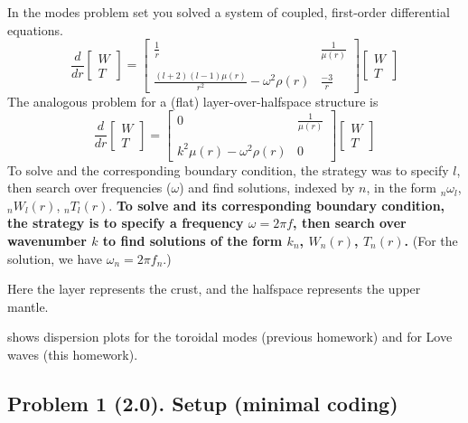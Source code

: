 \documentclass[11pt,titlepage,fleqn]{article}
\begin{document}
In the modes problem set you solved a system of coupled, first-order differential equations.
%
\begin{equation}
\frac{d}{dr}
\left[ \begin{array}{c} W \\ T \end{array} \right]
=
\left[ \begin{array}{cc}
\frac{1}{r} & \frac{1}{\mu(r)} \\
& \\
\frac{(l+2)(l-1)\mu(r)}{r^2} -\omega^2\rho(r)  & \frac{-3}{r}
\end{array} \right]
\left[ \begin{array}{c} W \\ T \end{array} \right]
\label{ODEs}
\end{equation}
%
The analogous problem for a (flat) layer-over-halfspace structure is
%
\begin{equation}
\frac{d}{dr}
\left[ \begin{array}{c} W \\ T \end{array} \right]
=
\left[ \begin{array}{cc}
0 & \frac{1}{\mu(r)} \\
& \\
k^2 \mu(r)-\omega^2\rho(r) & 0
\end{array} \right]
\left[ \begin{array}{c} W \\ T \end{array} \right]
\label{rODEs}
\end{equation}
%
To solve  and the corresponding boundary condition, the strategy was to specify $l$, then search over frequencies ($\omega$) and find solutions, indexed by $n$, in the form $_n\omega_l$, $_nW_l(r)$, $_nT_l(r)$. {\bf To solve  and its corresponding boundary condition, the strategy is to specify a frequency $\omega = 2\pi f$, then search over wavenumber $k$ to find solutions of the form $k_n$, $W_n(r)$, $T_n(r)$.} (For the solution, we have $\omega_n = 2\pi f_n$.)

Here the layer represents the crust, and the halfspace represents the upper mantle.

 shows dispersion plots for the toroidal modes (previous homework) and for Love waves (this homework).


\subsection*{Problem 1 (2.0). Setup (minimal coding)}
\end{document}
